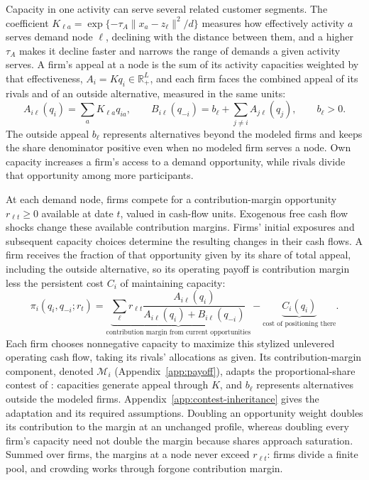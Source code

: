 Capacity in one activity can serve several related customer segments.
The coefficient $K_{\ell a}=\exp\{-\tau_A\|x_a-z_\ell\|^2/d\}$ measures how
effectively activity $a$ serves demand node $\ell$, declining with the
distance between them, and a higher $\tau_A$ makes it decline faster and narrows
the range of demands a given activity serves.
A firm's appeal at a node is the sum of its activity capacities weighted by
that effectiveness, $A_i=Kq_i\in\mathbb R_+^L$, and each firm faces the
combined appeal of its rivals and of an outside alternative, measured in the
same units:
\begin{equation}\label{eq:appeal}
  A_{i\ell}(q_i)=\sum_{a}K_{\ell a}q_{ia},\qquad
  B_{i\ell}(q_{-i})=b_\ell+\sum_{j\ne i}A_{j\ell}(q_j),\qquad b_\ell>0.
\end{equation}
The outside appeal $b_\ell$ represents alternatives beyond the modeled firms
and keeps the share denominator positive even when no modeled firm
serves a node.
Own capacity increases a firm's access to a demand opportunity, while rivals
divide that opportunity among more participants.

At each demand node, firms compete for a contribution-margin opportunity
$r_{\ell t}\geq0$ available at date $t$, valued in cash-flow units.
Exogenous free cash flow shocks change these available contribution margins.
Firms' initial exposures and subsequent capacity choices determine the
resulting changes in their cash flows.
A firm receives the fraction of that opportunity given by its share of total
appeal, including the outside alternative, so its operating payoff is
contribution margin less the persistent cost
$C_i$ of maintaining capacity:
\begin{equation}\label{eq:firm-problem}
  \pi_i(q_i,q_{-i};r_t)=
  \underbrace{\sum_\ell r_{\ell t}
  \frac{A_{i\ell}(q_i)}{A_{i\ell}(q_i)+B_{i\ell}(q_{-i})}}
  _{\text{contribution margin from current opportunities}}
  -\underbrace{C_i(q_i)}_{\text{cost of positioning there}}.
\end{equation}
Each firm chooses nonnegative capacity to maximize this stylized unlevered
operating cash flow, taking its rivals' allocations as given.
Its contribution-margin component, denoted $\mathcal M_i$
(Appendix~\ref{app:payoff}), adapts the proportional-share contest of
\citet{xu_zenou_zhou_conflict_2022}: capacities generate appeal through $K$,
and $b_\ell$ represents alternatives outside the modeled firms.
Appendix~\ref{app:contest-inheritance} gives the adaptation and its required
assumptions.
Doubling an opportunity weight doubles its contribution to the margin at an
unchanged profile, whereas doubling every firm's capacity need not double the
margin because shares approach saturation.
Summed over firms, the margins at a node never exceed $r_{\ell t}$: firms
divide a finite pool, and crowding works through forgone contribution margin.

